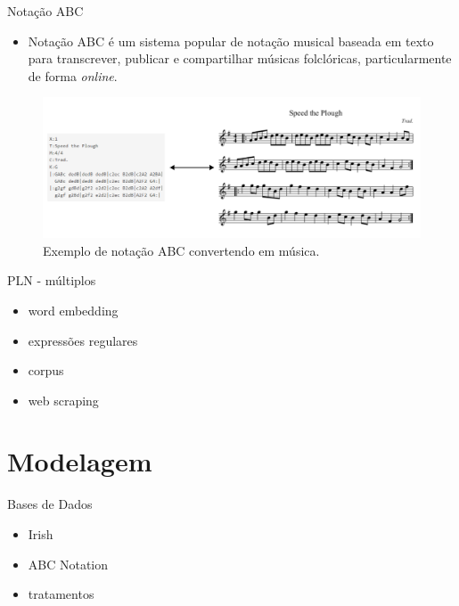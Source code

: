 \documentclass{beamer}
\begin{document}
    \begin{frame}{Notação ABC}
        \begin{itemize}
            \justifying
            \item Notação ABC é um sistema popular de notação musical baseada em texto para transcrever, publicar e compartilhar músicas folclóricas, particularmente de forma \textit{online}. 
        \end{itemize}

        \begin{figure}
            \vspace{-0.5cm}
            \centering
            \includegraphics[scale=0.25]{figuras/abc_notation_example.pdf}
	        \caption{Exemplo de notação ABC convertendo em música.}
        \end{figure}
    \end{frame}

    \begin{frame}{PLN - múltiplos}
        \begin{itemize}
            \item word embedding
            \item expressões regulares
            \item corpus
            \item web scraping
        \end{itemize}
    \end{frame}



\section{Modelagem}
    \begin{frame}{Bases de Dados}
        \begin{itemize}
            \item Irish
            \item ABC Notation
            \item tratamentos
        \end{itemize}
    \end{frame}
\end{document}
